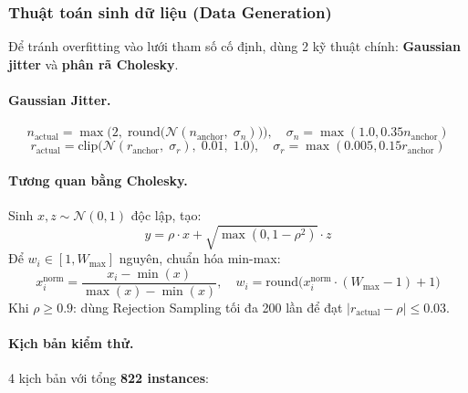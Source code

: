 \subsubsection{Thuật toán sinh dữ liệu (Data Generation)}

Để tránh overfitting vào lưới tham số cố định, dùng 2 kỹ thuật chính: \textbf{Gaussian jitter} và \textbf{phân rã Cholesky}.

\paragraph{Gaussian Jitter.}
\begin{equation}
    n_{\text{actual}} = \max\!\Big(2,\;\text{round}\big(\mathcal{N}(n_{\text{anchor}},\;\sigma_n)\big)\Big), \quad \sigma_n = \max(1.0, 0.35 n_{\text{anchor}})
\end{equation}
\begin{equation}
    r_{\text{actual}} = \text{clip}\!\Big(\mathcal{N}(r_{\text{anchor}},\;\sigma_r),\;0.01,\;1.0\Big), \quad \sigma_r = \max(0.005, 0.15 r_{\text{anchor}})
\end{equation}

\paragraph{Tương quan bằng Cholesky.} Sinh $x, z \sim \mathcal{N}(0,1)$ độc lập, tạo:
\begin{equation}
    y = \rho \cdot x + \sqrt{\max(0, 1 - \rho^2)} \cdot z
\end{equation}
Để $w_i \in [1, W_{\text{max}}]$ nguyên, chuẩn hóa min-max:
\begin{equation}
    x_i^{\text{norm}} = \frac{x_i - \min(x)}{\max(x) - \min(x)}, \quad w_i = \text{round}\big(x_i^{\text{norm}} \cdot (W_{\text{max}} - 1) + 1\big)
\end{equation}
Khi $\rho \ge 0.9$: dùng Rejection Sampling tối đa 200 lần để đạt $|r_{\text{actual}} - \rho| \le 0.03$.

\paragraph{Kịch bản kiểm thử.} 4 kịch bản với tổng \textbf{822 instances}:

